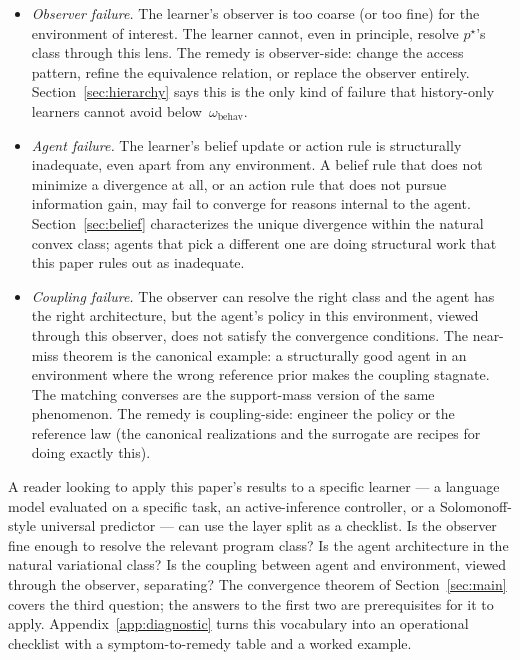 \documentclass[11pt]{article}
\theoremstyle{definition}
\theoremstyle{remark}
\begin{document}
\begin{itemize}
\item \emph{Observer failure.} The learner's observer is too coarse (or too fine) for the environment of interest. The learner cannot, even in principle, resolve $p^\star$'s class through this lens. The remedy is observer-side: change the access pattern, refine the equivalence relation, or replace the observer entirely. Section~\ref{sec:hierarchy} says this is the only kind of failure that history-only learners cannot avoid below~$\omega_{\mathrm{behav}}$.
\item \emph{Agent failure.} The learner's belief update or action rule is structurally inadequate, even apart from any environment. A belief rule that does not minimize a divergence at all, or an action rule that does not pursue information gain, may fail to converge for reasons internal to the agent. Section~\ref{sec:belief} characterizes the unique divergence within the natural convex class; agents that pick a different one are doing structural work that this paper rules out as inadequate.
\item \emph{Coupling failure.} The observer can resolve the right class and the agent has the right architecture, but the agent's policy in this environment, viewed through this observer, does not satisfy the convergence conditions. The near-miss theorem is the canonical example: a structurally good agent in an environment where the wrong reference prior makes the coupling stagnate. The matching converses are the support-mass version of the same phenomenon. The remedy is coupling-side: engineer the policy or the reference law (the canonical realizations and the surrogate are recipes for doing exactly this).
\end{itemize}

A reader looking to apply this paper's results to a specific learner --- a language model evaluated on a specific task, an active-inference controller, or a Solomonoff-style universal predictor --- can use the layer split as a checklist. Is the observer fine enough to resolve the relevant program class? Is the agent architecture in the natural variational class? Is the coupling between agent and environment, viewed through the observer, separating? The convergence theorem of Section~\ref{sec:main} covers the third question; the answers to the first two are prerequisites for it to apply. Appendix~\ref{app:diagnostic} turns this vocabulary into an operational checklist with a symptom-to-remedy table and a worked example.
\end{document}
